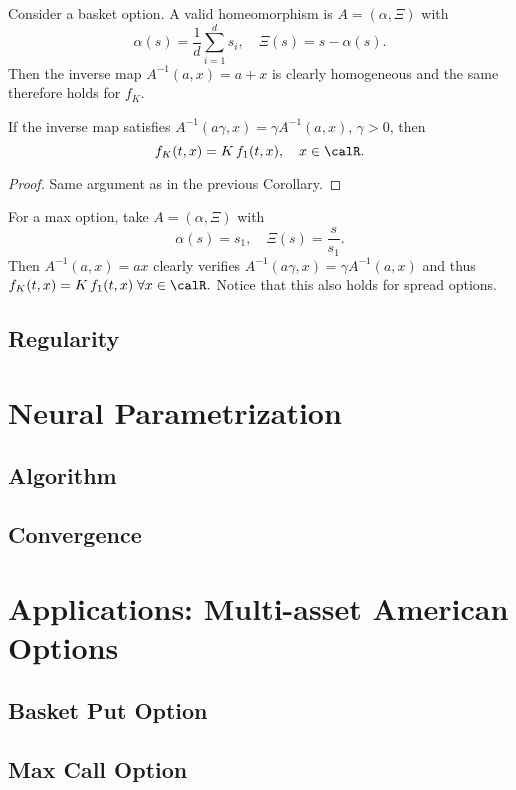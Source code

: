 \begin{example}
Consider a basket
option. A valid homeomorphism is  $A=(\alpha,\Xi)$ with  $$\alpha(s) = \frac{1}{d} \sum_{i=1}^d s_i, \quad \Xi(s) = s - \alpha(s).$$
Then the inverse map $A^{-1}(a,x)=a+x$ is clearly homogeneous and the same therefore holds for $f_K$.
\end{example}

\begin{corollary}
If the inverse map satisfies $A^{-1}(a\gamma,x) = \gamma A^{-1}(a,x)$, $\gamma>0$, then 
$$f_K(t,x)= K \, f_1(t,x), \quad x \in \calR.$$
\end{corollary}

\begin{proof}
Same argument as in the previous Corollary.
\end{proof}

\begin{example}
For a max option, take $A=(\alpha,\Xi)$ with  $$\alpha(s) = s_1, \quad \Xi(s) = \frac{s}{s_1}.$$
Then  $A^{-1}(a,x)=a x$ clearly verifies $A^{-1}(a\gamma,x) = \gamma A^{-1}(a,x)$ and thus $f_K(t,x)= K \, f_1(t,x) \; \forall  x \in \calR.$ Notice that this also holds for spread options.
\end{example}


\subsection{Regularity}

\section{Neural Parametrization}
\subsection{Algorithm}
\subsection{Convergence}

\section{Applications: Multi-asset American Options}
\subsection{Basket Put Option}
\subsection{Max Call Option}